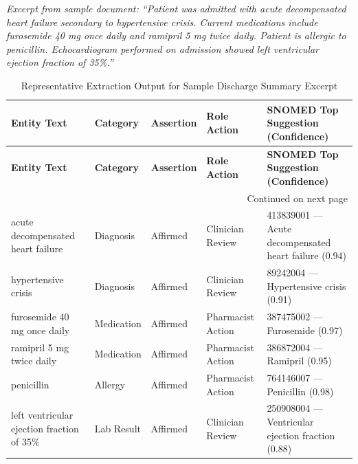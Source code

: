 \textit{Excerpt from sample document: ``Patient was admitted with acute decompensated heart failure secondary to hypertensive crisis. Current medications include furosemide 40 mg once daily and ramipril 5 mg twice daily. Patient is allergic to penicillin. Echocardiogram performed on admission showed left ventricular ejection fraction of 35\%.''}

\begin{longtable}{|p{3.5cm}|p{2cm}|p{2cm}|p{2.5cm}|p{4cm}|}
\caption{Representative Extraction Output for Sample Discharge Summary Excerpt}
\label{tab:extraction_output}\\

\hline
\textbf{Entity Text} &
\textbf{Category} &
\textbf{Assertion} &
\textbf{Role Action} &
\textbf{SNOMED Top Suggestion (Confidence)} \\
\hline
\endfirsthead

\hline
\textbf{Entity Text} &
\textbf{Category} &
\textbf{Assertion} &
\textbf{Role Action} &
\textbf{SNOMED Top Suggestion (Confidence)} \\
\hline
\endhead

\hline
\multicolumn{5}{r}{Continued on next page} \\
\endfoot

\hline
\endlastfoot


acute decompensated heart failure &
Diagnosis &
Affirmed &
Clinician Review &
413839001 --- Acute decompensated heart failure (0.94)
\\
\hline

hypertensive crisis &
Diagnosis &
Affirmed &
Clinician Review &
89242004 --- Hypertensive crisis (0.91)
\\
\hline

furosemide 40 mg once daily &
Medication &
Affirmed &
Pharmacist Action &
387475002 --- Furosemide (0.97)
\\
\hline

ramipril 5 mg twice daily &
Medication &
Affirmed &
Pharmacist Action &
386872004 --- Ramipril (0.95)
\\
\hline

penicillin &
Allergy &
Affirmed &
Pharmacist Action &
764146007 --- Penicillin (0.98)
\\
\hline

left ventricular ejection fraction of 35\% &
Lab Result &
Affirmed &
Clinician Review &
250908004 --- Ventricular ejection fraction (0.88)
\\
\hline

\end{longtable}

